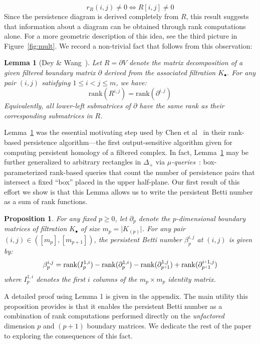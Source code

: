 \documentclass[10pt]{article}
\newcommand{\+}{%
	\raisebox{0.18ex}{\scaleobj{0.55}{+}}
}
\newtheorem{proposition}{Proposition}
\newtheorem{lemma}{Lemma}
\begin{document}
$$ r_R(i,j) \neq 0 \Leftrightarrow R[i,j] \neq 0 $$
Since the persistence diagram is derived completely from $R$, this result suggests that information about a diagram can be obtained through rank computations alone.
For a more geometric description of this idea, see the third picture in Figure~\ref{fig:mult}. We record a non-trivial fact that follows from this observation: 
\begin{lemma}[Dey \& Wang~\cite{dey2022computational}]\label{lemma:rank}
Let $R = \partial V$ denote the matrix decomposition of a given filtered boundary matrix $\partial$ derived from the associated filtration $K_\bullet$. For any pair $(i,j)$ satisfying $1 \leq i < j \leq m$, we have:
	\begin{equation}\label{eq:lower_left_rank}
		\mathrm{rank}(R^{i,j}) = \mathrm{rank}(\partial^{i, j})
	\end{equation}
Equivalently, all lower-left submatrices of $\partial$ have the same rank as their corresponding submatrices in $R$. 
\end{lemma}
\noindent Lemma~\ref{lemma:rank} was the essential motivating step used by Chen et al~\cite{chen2011output} in their rank-based persistence algorithm---the first output-sensitive algorithm given for computing persistent homology of a filtered complex. 
In fact, Lemma~\ref{lemma:rank} may be further generalized to arbitrary rectangles in $\Delta_+$ via $\mu$\emph{-queries}~\cite{chen2011output}: box-parameterized rank-based queries that count the number of persistence pairs that intersect a fixed ``box'' placed in the upper half-plane. 
Our first result of this effort we show is that this Lemma allows us to write the persistent Betti number as a sum of rank functions. 
\begin{proposition}
For any fixed $p \geq 0$, let $\partial_p$ denote the $p$-dimensional boundary matrices of filtration $K_\bullet$ of size $m_p = \lvert K_{(p)} \rvert$. For any pair $(i,j) \in \left([m_p], [m_{p+1}] \right)$, the persistent Betti number $\beta_p^{i,j}$ at $(i,j)$ is given by:
	\begin{equation}\label{eq:betti_four}
	\beta_p^{i,j} = \mathrm{rank}(I_p^{1,i}) - \mathrm{rank}(\partial_p^{1,i}) - \mathrm{rank}(\partial_{p\+1 }^{1,j}) + \mathrm{rank}(\partial_{p\+1}^{i \+ 1, j} )
	\end{equation}
where $I_p^{1,i}$ denotes the first $i$ columns of the $m_p \times m_p$ identity matrix.
\end{proposition}
\noindent A detailed proof using Lemma 1 is given in the appendix. The main utility this proposition provides is that it enables the persistent Betti number as a combination of rank computations performed directly on the \emph{unfactored} dimension $p$ and $(p+1)$ boundary matrices. We dedicate the rest of the paper to exploring the consequences of this fact. 
\end{document}
